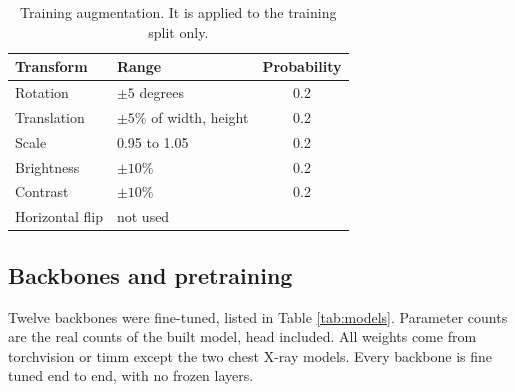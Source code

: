 \documentclass{article}
\begin{document}
\begin{table}[H]
  \caption{Training augmentation. It is applied to the training split only.}
  \centering
  \begin{tabular}{llc}
    \toprule
    Transform       & Range                      & Probability \\
    \midrule
    Rotation        & $\pm 5$ degrees            & 0.2         \\
    Translation     & $\pm 5\%$ of width, height & 0.2         \\
    Scale           & 0.95 to 1.05               & 0.2         \\
    Brightness      & $\pm 10\%$                 & 0.2         \\
    Contrast        & $\pm 10\%$                 & 0.2         \\
    Horizontal flip & not used                   &             \\
    \bottomrule
  \end{tabular}
  \label{tab:augmentation}
\end{table}

\subsection{Backbones and pretraining}

Twelve backbones were fine-tuned, listed in Table \ref{tab:models}. Parameter counts
are the real counts of the built model, head included. All weights come from torchvision or timm
\cite{wightman2019timm} except the two chest X-ray models. Every backbone is fine
tuned end to end, with no frozen layers.
\end{document}
